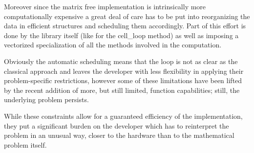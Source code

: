 \documentclass{article}
\begin{document}
Moreover since the matrix free implementation is intrinsically more computationally expensive a great deal of care has to be put into reorganizing the data in efficient structures and scheduling them accordingly. Part of this effort is done by the library itself (like for the cell\_loop method) as well as imposing a vectorized specialization of all the methods involved in the computation. 

Obviously the automatic scheduling means that the loop is not as clear as the classical approach and leaves the developer with less flexibility in applying their problem-specific restrictions, however some of these limitations have been lifted by the recent addition of more, but still limited, function capabilities; still, the underlying problem persists.

While these constraints allow for a guaranteed efficiency of the implementation, they put a significant burden on the developer which has to reinterpret the problem in an unusual way, closer to the hardware than to the mathematical problem itself.

\printbibliography %
\end{document}
